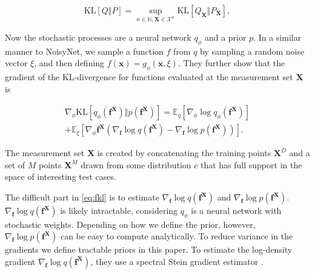 \documentclass[]{uai2021} %
\newcommand{\defeq}{\vcentcolon=}
\newcommand{\E}{\mathbb{E}}
\newcommand{\N}{\mathbb{N}}
\newcommand{\D}{\mathcal{D}}
\newcommand{\B}{\mathcal{B}}
\newcommand{\X}{\mathbf{X}}
\newcommand{\f}{\mathbf{f}}
\newcommand{\KL}{\mathrm{KL}}
\begin{document}
\begin{equation}
    \KL[Q \Vert P] = \sup_{n \in \N, \X \in \mathcal{X}^n} \KL \left[ Q_\X \Vert P_\X \right],
\end{equation}

Now the stochastic processes are a neural network \(q_\phi\) and a prior \(p\). In a similar
manner to NoisyNet, we sample a function \(f\) from \(q\) by sampling a random noise vector
\(\xi\), and then defining \(f(\bm{x}) = g_\phi(\bm{x}, \xi)\). They further show that the
gradient of the KL-divergence for functions evaluated at the measurement set \(\X\) is

\begin{multline}\label{eq:fkl}
    \nabla_\phi \KL[q_\phi(\f^\X) \Vert p(\f^\X)] = \E_q \left[ \nabla_\phi \log q_\phi (\f^\X) \right]\\
    + \E_\xi \left[ \nabla_\phi \f^\X( \nabla_\f \log q(\f^\X) - \nabla_\f \log p(\f^\X)) \right].
\end{multline}

The measurement set \(\X\) is created by concatenating the training points \(\X^D\) and a
set of \(M\) points \(\X^M\) drawn from some distribution \(c\) that has full support
in the space of interesting test cases. 

The difficult part in \eqref{eq:fkl} is to estimate \(\nabla_\f \log q(\f^\X)\)
and \(\nabla_\f \log p(\f^\X)\). \(\nabla_\f \log q(\f^\X)\) is likely 
intractable, considering \(q_\phi\) is a neural network with stochastic weights.
Depending on how we define the prior, however, \(\nabla_\f \log p(\f^\X)\)
can be easy to compute analytically. To reduce variance in the gradients we
define tractable priors in this paper. To estimate the log-density gradient
\(\nabla_\f \log q(\f^\X)\), they use a spectral Stein gradient estimator
\citep{shi_spectral_2018}.

\end{document}

